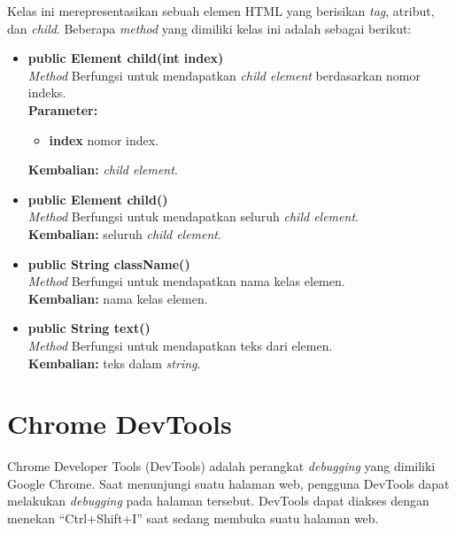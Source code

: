 Kelas ini merepresentasikan sebuah elemen HTML yang berisikan \textit{tag}, atribut, dan \textit{child}. Beberapa \textit{method} yang dimiliki kelas ini adalah sebagai berikut:
\begin{itemize}
	\item \textbf{public Element child(int index)} \\
		\textit{Method} Berfungsi untuk mendapatkan \textit{child element} berdasarkan nomor indeks. \\
		\textbf{Parameter:} 
		\begin{itemize}
			\item \textbf{index} nomor index.
		\end{itemize}
		\textbf{Kembalian:} \textit{child element}.	
		
		\item \textbf{public Element child()} \\
		\textit{Method} Berfungsi untuk mendapatkan seluruh \textit{child element}. \\
		\textbf{Kembalian:} seluruh \textit{child element}.	
		
		\item \textbf{public String className()} \\
		\textit{Method} Berfungsi untuk mendapatkan nama kelas elemen. \\
		\textbf{Kembalian:} nama kelas elemen.	
		
		\item \textbf{public String text()} \\
		\textit{Method} Berfungsi untuk mendapatkan teks dari elemen. \\
		\textbf{Kembalian:} teks dalam \textit{string}.	
\end{itemize}



\section{Chrome DevTools}
\label{sec:devtools}

Chrome Developer Tools (DevTools)\cite{devtools} adalah perangkat \textit{debugging} yang dimiliki Google Chrome. Saat menunjungi suatu halaman web, pengguna DevTools dapat melakukan \textit{debugging} pada halaman tersebut. DevTools dapat diakses dengan menekan "`Ctrl+Shift+I"' saat sedang membuka suatu halaman web.  

